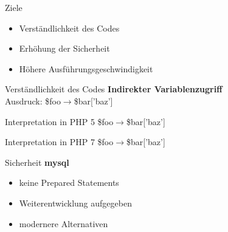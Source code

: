 
    
\begin{frame}{Ziele}
    \begin{itemize}
        \item Verständlichkeit des Codes
        \item Erhöhung der Sicherheit
        \item Höhere Ausführungsgeschwindigkeit
    \end{itemize}  
\end{frame}

	\begin{frame} {Verständlichkeit des Codes}
		\textbf{Indirekter Variablenzugriff} \nocite{php_group_php:_nodate-1} \\
		Ausdruck: \$foo$\rightarrow$\$bar['baz']
		\begin{exampleblock}{Interpretation in PHP 5}
			\$foo$\rightarrow$\alert{\$bar['baz']}
		\end{exampleblock}{}
		\begin{exampleblock}{Interpretation in PHP 7}
			\alert{\$foo$\rightarrow$\$bar}['baz']
		\end{exampleblock}{}
	\end{frame}

    
%

    \begin{frame}[fragile]{Sicherheit}
        \textbf{mysql} \nocite{oracle_mysql_nodate}\\
        \begin{itemize}
            \item keine \alert{Prepared Statements}
            \item Weiterentwicklung aufgegeben
            \item modernere Alternativen
        \end{itemize}  
    \end{frame}
